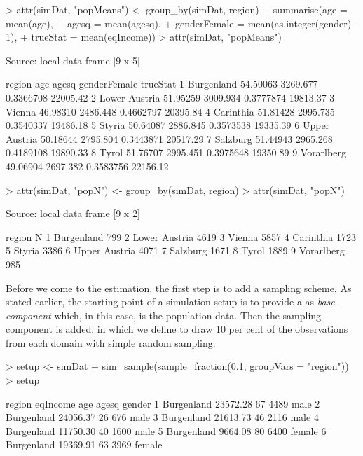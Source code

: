 \documentclass[article]{ajs}
\begin{document}
\begin{Schunk}
\begin{Sinput}
> attr(simDat, "popMeans") <- group_by(simDat, region) %
+   summarise(age = mean(age),
+             agesq = mean(agesq),
+             genderFemale = mean(as.integer(gender) - 1),
+             trueStat = mean(eqIncome))
> attr(simDat, "popMeans")
\end{Sinput}
\begin{Soutput}
Source: local data frame [9 x 5]

         region      age    agesq genderFemale trueStat
1    Burgenland 54.50063 3269.677    0.3366708 22005.42
2 Lower Austria 51.95259 3009.934    0.3777874 19813.37
3        Vienna 46.98310 2486.448    0.4662797 20395.84
4     Carinthia 51.81428 2995.735    0.3540337 19486.18
5        Styria 50.64087 2886.845    0.3573538 19335.39
6 Upper Austria 50.18644 2795.804    0.3443871 20517.29
7      Salzburg 51.44943 2965.268    0.4189108 19890.33
8         Tyrol 51.76707 2995.451    0.3975648 19350.89
9    Vorarlberg 49.06904 2697.382    0.3583756 22156.12
\end{Soutput}
\begin{Sinput}
> attr(simDat, "popN") <- group_by(simDat, region) %
> attr(simDat, "popN")
\end{Sinput}
\begin{Soutput}
Source: local data frame [9 x 2]

         region    N
1    Burgenland  799
2 Lower Austria 4619
3        Vienna 5857
4     Carinthia 1723
5        Styria 3386
6 Upper Austria 4071
7      Salzburg 1671
8         Tyrol 1889
9    Vorarlberg  985
\end{Soutput}
\end{Schunk}

Before we come to the estimation, the first step is to add a sampling scheme. As stated earlier, the starting point of a simulation setup is to provide a  as \textit{base-component} which, in this case, is the population data. Then the sampling component is added, in which we define to draw 10 per cent of the observations from each domain with simple random sampling.

\begin{Schunk}
\begin{Sinput}
> setup <- simDat %
+   sim_sample(sample_fraction(0.1, groupVars = "region"))
> setup
\end{Sinput}
\begin{Soutput}
      region eqIncome age agesq gender
1 Burgenland 23572.28  67  4489   male
2 Burgenland 24056.37  26   676   male
3 Burgenland 21613.73  46  2116   male
4 Burgenland 11750.30  40  1600   male
5 Burgenland  9664.08  80  6400 female
6 Burgenland 19369.91  63  3969 female
\end{Soutput}
\end{Schunk}
\end{document}
